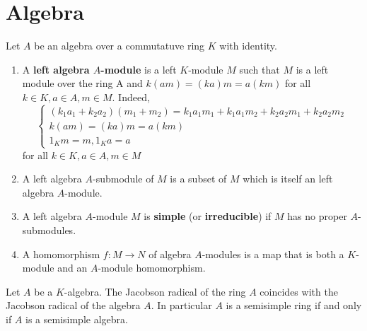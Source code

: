 \section{Algebra}
\begin{definition}
    Let $A$ be an algebra over a commutatuve ring $K$ with identity.
    \begin{enumerate}
        \item
              A \textbf{left algebra $A$-module} is a left $K$-module $M$ such that $M$ is a left module over the ring A and $k(am)=(ka) m=a(km )$ for all $k \in K, a \in A, m \in M$.
              Indeed,
              \begin{equation*}
                  \begin{cases*}
                      \left(k_1a_1+k_2a_2\right)\left(m_1+m_2\right)
                      =
                      k_1a_1m_1+k_1a_1m_2+k_2a_2m_1+k_2a_2m_2 \\
                      k(am)=(ka) m=a(km)                      \\
                      1_K m=m ,1_K a=a
                  \end{cases*}
              \end{equation*}
              for all $k \in K, a \in A, m \in M$

        \item
              A left algebra $A$-submodule of $M$ is a subset of $M$ which is itself an left algebra $A$-module.

        \item
              A left algebra $A$-module $M$ is \textbf{simple} (or \textbf{irreducible}) if $M$ has no proper $A$-submodules.

        \item
              A homomorphism $f: M \rightarrow N$ of algebra $A$-modules is a map that is both a $K$-module and an $A$-module homomorphism.
    \end{enumerate}
    \begin{remark}

    \end{remark}
\end{definition}

\begin{theorem}
    Let $A$ be a $K$-algebra.
    The Jacobson radical of the ring $A$ coincides with the Jacobson radical of the algebra $A$.
    In particular $A$ is a semisimple ring if and only if $A$ is a semisimple algebra.
\end{theorem}



